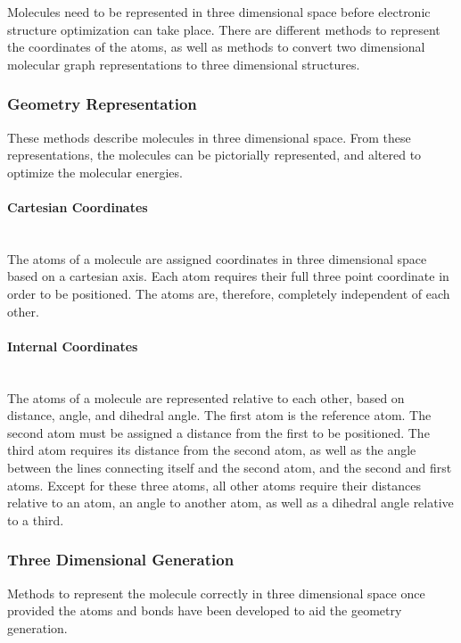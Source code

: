 \documentclass[12pt]{article}
\begin{document}
Molecules need to be represented in three dimensional space before electronic structure optimization can take place. There are different methods to represent the coordinates of the atoms, as well as methods to convert two dimensional molecular graph representations to three dimensional structures.

\subsubsection{Geometry Representation}

These methods describe molecules in three dimensional space. From these representations, the molecules can be pictorially represented, and altered to optimize the molecular energies.

\paragraph{Cartesian Coordinates}\mbox{}\\

The atoms of a molecule are assigned coordinates in three dimensional space based on a cartesian axis. Each atom requires their full three point coordinate in order to be positioned. The atoms are, therefore, completely independent of each other.

\paragraph{Internal Coordinates}\mbox{}\\

The atoms of a molecule are represented relative to each other, based on distance, angle, and dihedral angle. The first atom is the reference atom. The second atom must be assigned a distance from the first to be positioned. The third atom requires its distance from the second atom, as well as the angle between the lines connecting itself and the second atom, and the second and first atoms. Except for these three atoms, all other atoms require their distances relative to an atom, an angle to another atom, as well as a dihedral angle relative to a third.

\subsubsection{Three Dimensional Generation}

Methods to represent the molecule correctly in three dimensional space once provided the atoms and bonds have been developed to aid the geometry generation. 
\end{document}
